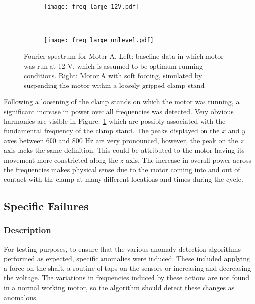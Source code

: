 \begin{figure}[t!]
    \centering
    \begin{subfigure}[t]{0.5\textwidth}
        \centering
        \texttt{[image: freq\_large\_12V.pdf]}
    \end{subfigure}%
    ~ 
    \begin{subfigure}[t]{0.5\textwidth}
        \centering
        \texttt{[image: freq\_large\_unlevel.pdf]}
    \end{subfigure}
    \caption[Fourier Plot Soft Footing]{Fourier spectrum for Motor A. Left: baseline data in which motor was run at 12 V, which is assumed to be optimum running conditions. Right: Motor A with soft footing, simulated by suspending the motor within a loosely gripped clamp stand. }
    \label{soft_footing}
\end{figure}

\vspace{20ex} %
Following a loosening of the clamp stands on which the motor was running, a significant increase in power over all frequencies was detected. Very obvious harmonics are visible in Figure.~\ref{soft_footing} which are possibly associated with the fundamental frequency of the clamp stand. The peaks displayed on the $x$ and $y$ axes between 600 and 800 Hz are very pronounced, however, the peak on the $z$ axis lacks the same definition. This could be attributed to the motor having its movement more constricted along the $z$ axis. The increase in overall power across the frequencies makes physical sense due to the motor coming into and out of contact with the clamp at many different locations and times during the cycle.


\subsection{Specific Failures}

\subsubsection{Description}

For testing purposes, to ensure that the various anomaly detection algorithms performed as expected, specific anomalies were induced. These included applying a force on the shaft, a routine of taps on the sensors or increasing and decreasing the voltage. The variations in frequencies induced by these actions are not found in a normal working motor, so the algorithm should detect these changes as anomalous. 

